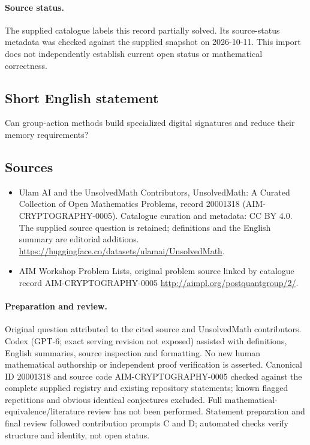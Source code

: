 \documentclass[11pt]{article}
\begin{document}
\paragraph{Source status.}
The supplied catalogue labels this record partially solved. Its source-status metadata was checked against the supplied snapshot on 2026-10-11. This import does not independently establish current open status or mathematical correctness.
\subsection{Short English statement}
Can group-action methods build specialized digital signatures and reduce their memory requirements?
\subsection{Sources}
\begin{itemize}
\item[\hypertarget{source:20001318:1}{S1}] Ulam AI and the UnsolvedMath Contributors, UnsolvedMath: A Curated Collection of Open Mathematics Problems, record 20001318 (AIM-CRYPTOGRAPHY-0005). Catalogue curation and metadata: CC BY 4.0. The supplied source question is retained; definitions and the English summary are editorial additions.
\url{https://huggingface.co/datasets/ulamai/UnsolvedMath}.
\item[\hypertarget{source:20001318:2}{S2}] AIM Workshop Problem Lists, original problem source linked by catalogue record AIM-CRYPTOGRAPHY-0005
\url{http://aimpl.org/postquantgroup/2/}.
\end{itemize}
\paragraph{Preparation and review.}
Original question attributed to the cited source and UnsolvedMath contributors. Codex (GPT-6; exact serving revision not exposed) assisted with definitions, English summaries, source inspection and formatting. No new human mathematical authorship or independent proof verification is asserted. Canonical ID 20001318 and source code AIM-CRYPTOGRAPHY-0005 checked against the complete supplied registry and existing repository statements; known flagged repetitions and obvious identical conjectures excluded. Full mathematical-equivalence/literature review has not been performed. Statement preparation and final review followed contribution prompts C and D; automated checks verify structure and identity, not open status.
\label{end:20001318}
\end{document}
